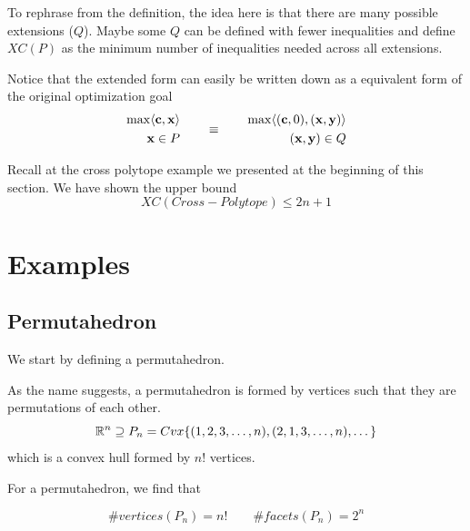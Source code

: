 To rephrase from the definition, the idea here is that there are many possible extensions ($Q$). Maybe some $Q$ can be defined with fewer inequalities and define $XC(P)$ as the minimum number of inequalities needed across all extensions. 

Notice that the extended form can easily be written down as a equivalent form of the original optimization goal 
\begin{equation}
	\begin{aligned}
		\max \langle \mathbf{c}, \mathbf{x} \rangle \\
		\mathbf{x} \in P
	\end{aligned}
	\quad \quad
	\equiv 
	\quad \quad 
	\begin{aligned}
		\max \langle (\mathbf{c}, 0), (\mathbf{x}, \mathbf{y}) \rangle \\
		(\mathbf{x}, \mathbf{y}) \in Q
	\end{aligned}
\end{equation}

Recall at the cross polytope example we presented at the beginning of this section. We have shown the upper bound 
\begin{equation}
	XC(Cross-Polytope) \leq 2n + 1
\end{equation}

\section{Examples}
\subsection{Permutahedron}
We start by defining a permutahedron. 
\begin{definition}
	[Permutahedron]
	As the name suggests, a permutahedron is formed by vertices such that they are permutations of each other. 
	\begin{equation}
		\mathbb{R}^n \supseteq P_n = Cvx \{ (1, 2, 3, \dots, n) , (2, 1, 3, \dots, n) , \dots  \}
	\end{equation}
	which is a convex hull formed by $n!$ vertices. 
\end{definition}
For a permutahedron, we find that
\begin{proposition}
	\begin{equation}
		\# vertices (P_n) = n! \quad \quad \# facets (P_n) = 2^n
	\end{equation}
\end{proposition}

